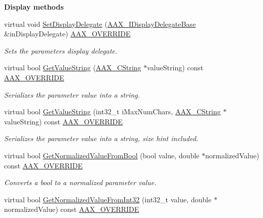 \begin{Indent}{\bf Display methods}\par
\begin{DoxyCompactItemize}
\item 
virtual void \hyperlink{a00033_a75619ec0a487c28966dc5448e4d2ab05}{Set\+Display\+Delegate} (\hyperlink{a00093}{A\+A\+X\+\_\+\+I\+Display\+Delegate\+Base} \&in\+Display\+Delegate) \hyperlink{a00149_ac2f24a5172689ae684344abdcce55463}{A\+A\+X\+\_\+\+O\+V\+E\+R\+R\+I\+D\+E}
\begin{DoxyCompactList}\small\item\em Sets the parameter\textquotesingle{}s display delegate. \end{DoxyCompactList}\item 
virtual bool \hyperlink{a00033_ae1dddbaf06ec0851dbf4eb09bad5b24f}{Get\+Value\+String} (\hyperlink{a00042}{A\+A\+X\+\_\+\+C\+String} $\ast$value\+String) const \hyperlink{a00149_ac2f24a5172689ae684344abdcce55463}{A\+A\+X\+\_\+\+O\+V\+E\+R\+R\+I\+D\+E}
\begin{DoxyCompactList}\small\item\em Serializes the parameter value into a string. \end{DoxyCompactList}\item 
virtual bool \hyperlink{a00033_abd06be49094c789895adeb4ef11c4f9e}{Get\+Value\+String} (int32\+\_\+t i\+Max\+Num\+Chars, \hyperlink{a00042}{A\+A\+X\+\_\+\+C\+String} $\ast$value\+String) const \hyperlink{a00149_ac2f24a5172689ae684344abdcce55463}{A\+A\+X\+\_\+\+O\+V\+E\+R\+R\+I\+D\+E}
\begin{DoxyCompactList}\small\item\em Serializes the parameter value into a string, size hint included. \end{DoxyCompactList}\item 
virtual bool \hyperlink{a00033_a67497b37e1a084d61a0e45601393a9cc}{Get\+Normalized\+Value\+From\+Bool} (bool value, double $\ast$normalized\+Value) const \hyperlink{a00149_ac2f24a5172689ae684344abdcce55463}{A\+A\+X\+\_\+\+O\+V\+E\+R\+R\+I\+D\+E}
\begin{DoxyCompactList}\small\item\em Converts a bool to a normalized parameter value. \end{DoxyCompactList}\item 
virtual bool \hyperlink{a00033_a6caba47a6476f96bba38748c5df0da32}{Get\+Normalized\+Value\+From\+Int32} (int32\+\_\+t value, double $\ast$normalized\+Value) const \hyperlink{a00149_ac2f24a5172689ae684344abdcce55463}{A\+A\+X\+\_\+\+O\+V\+E\+R\+R\+I\+D\+E}

\end{DoxyCompactItemize}
\end{Indent}
